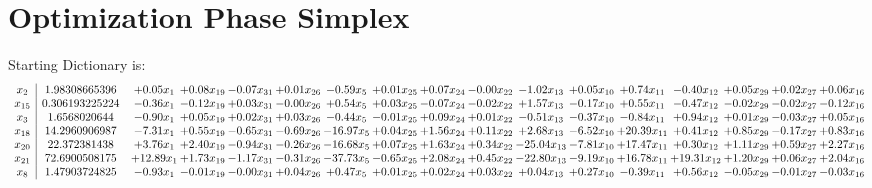 \documentclass[9pt]{article}
\begin{document}
\section{Optimization Phase Simplex}
Starting Dictionary is:
\[\begin{array}{c| c c@{\hskip 2pt} c@{\hskip 2pt} c@{\hskip 2pt} c@{\hskip 2pt} c@{\hskip 2pt} c@{\hskip 2pt} c@{\hskip 2pt} c@{\hskip 2pt} c@{\hskip 2pt} c@{\hskip 2pt} c@{\hskip 2pt} c@{\hskip 2pt} c@{\hskip 2pt} c@{\hskip 2pt} c@{\hskip 2pt} }
 x_{2}   &  1.98308665396 & +  0.05 x_{1} & +  0.08 x_{19} & -0.07 x_{31} & +  0.01 x_{26} & -0.59 x_{5} & +  0.01 x_{25} & +  0.07 x_{24} & -0.00 x_{22} & -1.02 x_{13} & +  0.05 x_{10} & +  0.74 x_{11} & -0.40 x_{12} & +  0.05 x_{29} & +  0.02 x_{27} & +  0.06 x_{16}\\
 x_{15}   &  0.306193225224 & -0.36 x_{1} & -0.12 x_{19} & +  0.03 x_{31} & -0.00 x_{26} & +  0.54 x_{5} & +  0.03 x_{25} & -0.07 x_{24} & -0.02 x_{22} & +  1.57 x_{13} & -0.17 x_{10} & +  0.55 x_{11} & -0.47 x_{12} & -0.02 x_{29} & -0.02 x_{27} & -0.12 x_{16}\\
 x_{3}   &  1.6568020644 & -0.90 x_{1} & +  0.05 x_{19} & +  0.02 x_{31} & +  0.03 x_{26} & -0.44 x_{5} & -0.01 x_{25} & +  0.09 x_{24} & +  0.01 x_{22} & -0.51 x_{13} & -0.37 x_{10} & -0.84 x_{11} & +  0.94 x_{12} & +  0.01 x_{29} & -0.03 x_{27} & +  0.05 x_{16}\\
 x_{18}   &  14.2960906987 & -7.31 x_{1} & +  0.55 x_{19} & -0.65 x_{31} & -0.69 x_{26} & -16.97 x_{5} & +  0.04 x_{25} & +  1.56 x_{24} & +  0.11 x_{22} & +  2.68 x_{13} & -6.52 x_{10} & + 20.39 x_{11} & +  0.41 x_{12} & +  0.85 x_{29} & -0.17 x_{27} & +  0.83 x_{16}\\
 x_{20}   &  22.372381438 & +  3.76 x_{1} & +  2.40 x_{19} & -0.94 x_{31} & -0.26 x_{26} & -16.68 x_{5} & +  0.07 x_{25} & +  1.63 x_{24} & +  0.34 x_{22} & -25.04 x_{13} & -7.81 x_{10} & + 17.47 x_{11} & +  0.30 x_{12} & +  1.11 x_{29} & +  0.59 x_{27} & +  2.27 x_{16}\\
 x_{21}   &  72.6900508175 & + 12.89 x_{1} & +  1.73 x_{19} & -1.17 x_{31} & -0.31 x_{26} & -37.73 x_{5} & -0.65 x_{25} & +  2.08 x_{24} & +  0.45 x_{22} & -22.80 x_{13} & -9.19 x_{10} & + 16.78 x_{11} & + 19.31 x_{12} & +  1.20 x_{29} & +  0.06 x_{27} & +  2.04 x_{16}\\
 x_{8}   &  1.47903724825 & -0.93 x_{1} & -0.01 x_{19} & -0.00 x_{31} & +  0.04 x_{26} & +  0.47 x_{5} & +  0.01 x_{25} & +  0.02 x_{24} & +  0.03 x_{22} & +  0.04 x_{13} & +  0.27 x_{10} & -0.39 x_{11} & +  0.56 x_{12} & -0.05 x_{29} & -0.01 x_{27} & -0.03 x_{16}\\

\end{array}\]
\end{document}
